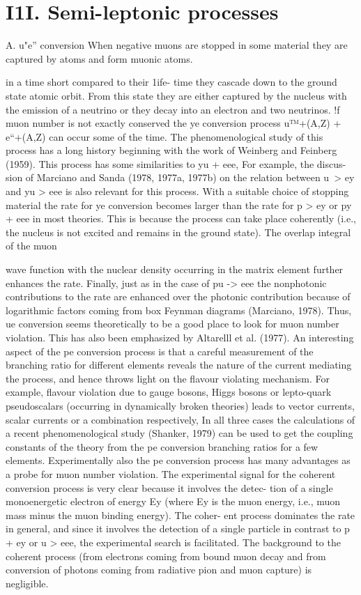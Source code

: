 \documentclass[twoside]{article}
\begin{document}
{{{{{{{{\section{\label{sec3}I1I. Semi-leptonic processes}


A. u"e” conversion
When negative muons are stopped in some material they are captured
by atoms and form muonic atoms. {in a time short compared to their 1ife-
time they cascade down to the ground state atomic orbit. From this state
they are either captured by the nucleus with the emission of a neutrino
or they decay into an electron and two neutrinos. !f muon number is not
exactly conserved the ye conversion process u™+(A,Z) + e“+(A,Z) can occur
some of the time. The phenomenological study of this process has a
long history beginning with the work of Weinberg and Feinberg (1959).
This process has some similarities to yu + eee, For example, the discus-
sion of Marciano and Sanda (1978, 1977a, 1977b) on the relation between
u~> ey and yu > eee is also relevant for this process. With a suitable
choice of stopping material the rate for ye conversion becomes larger
than the rate for p > ey or py + eee in most theories. This is because
the process can take place coherently (i.e., the nucleus is not excited
and remains in the ground state). The overlap integral of the muon

wave function with the nuclear density occurring in the matrix element
further enhances the rate. Finally, just as in the case of pu -> eee the
nonphotonic contributions to the rate are enhanced over the photonic
contribution because of logarithmic factors coming from box Feynman
diagrams (Marciano, 1978). Thus, ue conversion seems theoretically to
be a good place to look for muon number violation. This has also been
emphasized by Altarelll et al. (1977). An interesting aspect of the pe
conversion process is that a careful measurement of the branching ratio
for different elements reveals the nature of the current mediating the
process, and hence throws light on the flavour violating mechanism.
For example, flavour violation due to gauge bosons, Higgs bosons or
lepto-quark pseudoscalars (occurring in dynamically broken theories)
leads to vector currents, scalar currents or a combination respectively,
In all three cases the calculations of a recent phenomenological study
(Shanker, 1979) can be used to get the coupling constants of the
theory from the pe conversion branching ratios for a few elements.
Experimentally also the pe conversion process has many advantages
as a probe for muon number violation. The experimental signal for the
coherent conversion process is very clear because it involves the detec-
tion of a single monoenergetic electron of energy Ey (where Ey is the
muon energy, i.e., muon mass minus the muon binding energy). The coher-
ent process dominates the rate in general, and since it involves the
detection of a single particle in contrast to p + ey or u > eee, the
experimental search is facilitated. The background to the coherent
process (from electrons coming from bound muon decay and from conversion
of photons coming from radiative pion and muon capture) is negligible.

}}}}}}}}}
\end{document}
